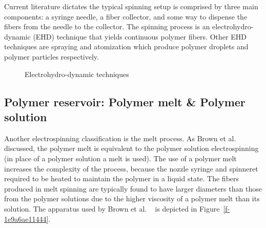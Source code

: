 \documentclass[5p,,preprint,12pt,twocolumn]{elsarticle}
\makeatletter
\def\fixFloatSize#1{}%
\makeatother
\begin{document}
Current literature dictates the typical spinning setup is comprised by three main components: a syringe needle, a fiber collector, and some way to dispense the fibers from the needle to the collector. The spinning process is an electrohydro-dynamic (EHD) technique that yields continuous polymer fibers. Other EHD techniques are spraying and atomization which produce polymer droplets and polymer particles respectively.


\bgroup
\fixFloatSize{images/514dfac6-849d-4905-8e40-7adfafc93b5f-uimg_ehd_techniques.png}
\begin{figure}[!htbp]
\centering \makeatletter{}
\makeatother 
\caption{{Electrohydro-dynamic techniques}}
\label{f-02e0e3cf88d6}
\end{figure}
\egroup




\subsection{Polymer reservoir: Polymer melt \& Polymer solution}Another electrospinning classification is the melt process. As Brown et al. \unskip~\cite{527120:13445499} discussed, the polymer melt is equivalent to the polymer solution electrospinning (in place of a polymer solution a melt is used). The use of a polymer melt increases the complexity of the process, because the nozzle syringe and spinneret required to be heated to maintain the polymer in a liquid state. The fibers produced in melt spinning are typically found to have larger diameters than those from the polymer solutions due to the higher viscosity of a polymer melt than its solution. The apparatus used by Brown et al. \unskip~\cite{527120:13445499} is depicted in Figure~\ref{f-1e9a6ae11444}.
\end{document}
